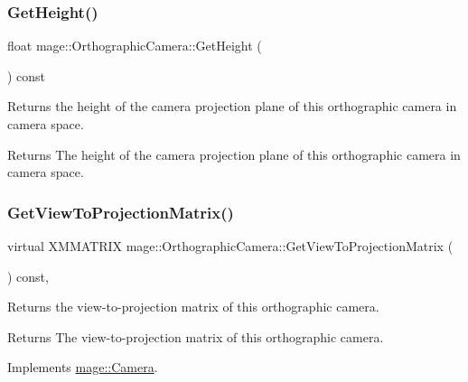 \subsubsection{\texorpdfstring{Get\+Height()}{GetHeight()}}
{\footnotesize\ttfamily float mage\+::\+Orthographic\+Camera\+::\+Get\+Height (\begin{DoxyParamCaption}{ }\end{DoxyParamCaption}) const}

Returns the height of the camera projection plane of this orthographic camera in camera space.

\begin{DoxyReturn}{Returns}
The height of the camera projection plane of this orthographic camera in camera space. 
\end{DoxyReturn}
\hypertarget{classmage_1_1_orthographic_camera_aedd86e56a0f7bc967ad8d9be2631a0cf}{}\label{classmage_1_1_orthographic_camera_aedd86e56a0f7bc967ad8d9be2631a0cf} 
\subsubsection{\texorpdfstring{Get\+View\+To\+Projection\+Matrix()}{GetViewToProjectionMatrix()}}
{\footnotesize\ttfamily virtual X\+M\+M\+A\+T\+R\+IX mage\+::\+Orthographic\+Camera\+::\+Get\+View\+To\+Projection\+Matrix (\begin{DoxyParamCaption}{ }\end{DoxyParamCaption}) const\hspace{0.3cm}{\ttfamily [override]}, {\ttfamily [virtual]}}

Returns the view-\/to-\/projection matrix of this orthographic camera.

\begin{DoxyReturn}{Returns}
The view-\/to-\/projection matrix of this orthographic camera. 
\end{DoxyReturn}


Implements \hyperlink{classmage_1_1_camera_a1f5206864cf18b5548219492556df5d2}{mage\+::\+Camera}.

\hypertarget{classmage_1_1_orthographic_camera_ac8daeca630e0f4503354e3eede7ead5c}{}\label{classmage_1_1_orthographic_camera_ac8daeca630e0f4503354e3eede7ead5c} 
